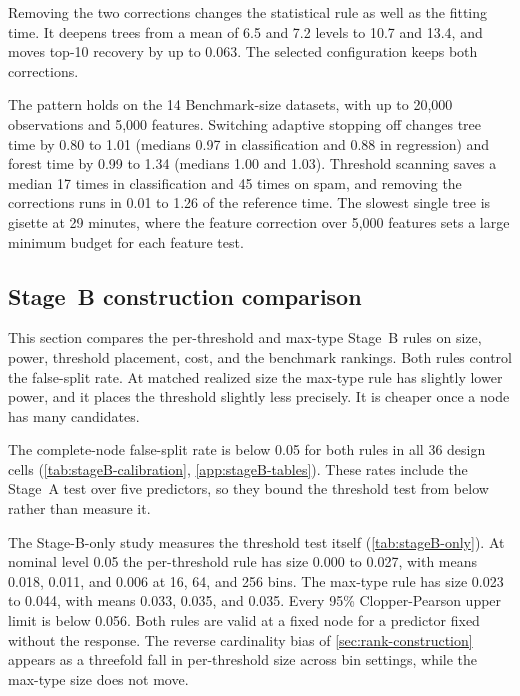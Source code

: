 Removing the two corrections changes the statistical rule as well as the
fitting time. It deepens trees from a mean of 6.5 and 7.2 levels to 10.7 and
13.4, and moves top-10 recovery by up to 0.063. The selected configuration
keeps both corrections.

The pattern holds on the 14 Benchmark-size datasets, with up to 20,000
observations and 5,000 features. Switching adaptive stopping off changes tree
time by 0.80 to 1.01 (medians 0.97 in classification and 0.88 in regression)
and forest time by 0.99 to 1.34 (medians 1.00 and 1.03). Threshold scanning
saves a median 17 times in classification and 45 times on spam, and removing
the corrections runs in 0.01 to 1.26 of the reference time. The slowest single
tree is gisette at 29 minutes, where the feature correction over 5,000 features
sets a large minimum budget for each feature test.

\subsection{Stage~B construction comparison}
\label{sec:results-stageB}

This section compares the per-threshold and max-type Stage~B rules on size,
power, threshold placement, cost, and the benchmark rankings. Both rules
control the false-split rate. At matched realized size the max-type rule has
slightly lower power, and it places the threshold slightly less precisely. It
is cheaper once a node has many candidates.

The complete-node false-split rate is below 0.05 for both rules in all 36
design cells (\cref{tab:stageB-calibration}, \cref{app:stageB-tables}). These
rates include the Stage~A test over five predictors, so they bound the
threshold test from below rather than measure it.

The Stage-B-only study measures the threshold test itself
(\cref{tab:stageB-only}). At nominal level 0.05 the per-threshold rule has size
0.000 to 0.027, with means 0.018, 0.011, and 0.006 at 16, 64, and 256 bins.
The max-type rule has size 0.023 to 0.044, with means 0.033, 0.035, and 0.035.
Every 95\% Clopper-Pearson upper limit is below 0.056. Both rules are valid at
a fixed node for a predictor fixed without the response. The reverse
cardinality bias of \cref{sec:rank-construction} appears as a threefold fall in
per-threshold size across bin settings, while the max-type size does not move.

